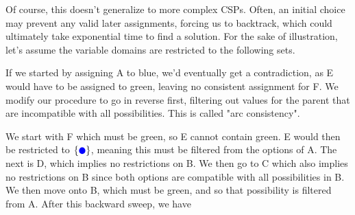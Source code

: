 \begin{center}
\end{center}

Of course, this doesn't generalize to more complex CSPs. Often, an initial choice may prevent any valid later assignments, forcing us to backtrack, which could ultimately take exponential time to find a solution. For the sake of illustration, let's assume the variable domains are restricted to the following sets.

\begin{center}
\end{center}

If we started by assigning A to blue, we'd eventually get a contradiction, as E would have to be assigned to green, leaving no consistent assignment for F. We modify our procedure to go in reverse first, filtering out values for the parent that are incompatible with all possibilities. This is called "arc consistency".

We start with F which must be green, so E cannot contain green. E would then be restricted to $\{{\color{blue}\CIRCLE}\}$, meaning this must be filtered from the options of A. The next is D, which implies no restrictions on B. We then go to C which also implies no restrictions on B since both options are compatible with all possibilities in B. We then move onto B, which must be green, and so that possibility is filtered from A. After this backward sweep, we have

